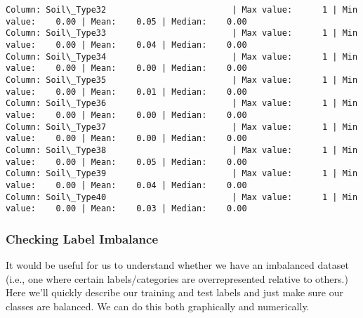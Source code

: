 \documentclass[11pt]{article}
\begin{document}
\begin{Verbatim}[commandchars=\\\{\}]
Column: Soil\_Type32                         | Max value:      1 | Min value:    0.00 | Mean:    0.05 | Median:    0.00
Column: Soil\_Type33                         | Max value:      1 | Min value:    0.00 | Mean:    0.04 | Median:    0.00
Column: Soil\_Type34                         | Max value:      1 | Min value:    0.00 | Mean:    0.00 | Median:    0.00
Column: Soil\_Type35                         | Max value:      1 | Min value:    0.00 | Mean:    0.01 | Median:    0.00
Column: Soil\_Type36                         | Max value:      1 | Min value:    0.00 | Mean:    0.00 | Median:    0.00
Column: Soil\_Type37                         | Max value:      1 | Min value:    0.00 | Mean:    0.00 | Median:    0.00
Column: Soil\_Type38                         | Max value:      1 | Min value:    0.00 | Mean:    0.05 | Median:    0.00
Column: Soil\_Type39                         | Max value:      1 | Min value:    0.00 | Mean:    0.04 | Median:    0.00
Column: Soil\_Type40                         | Max value:      1 | Min value:    0.00 | Mean:    0.03 | Median:    0.00

    \end{Verbatim}

    \subsubsection{Checking Label Imbalance}\label{checking-label-imbalance}

    It would be useful for us to understand whether we have an imbalanced
dataset (i.e., one where certain labels/categories are overrepresented
relative to others.) Here we'll quickly describe our training and test
labels and just make sure our classes are balanced. We can do this both
graphically and numerically.
\end{document}
